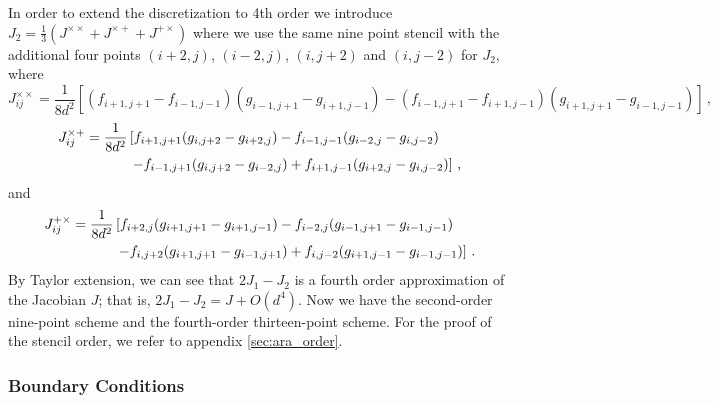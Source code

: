 In order to extend the discretization to 4th order we introduce $J_2=\frac{1}{3}(J^{\times \times} + J^{\times+} + J^{+\times})$ where we use the same nine point stencil with the additional
four points $(i+2,j)$, $(i-2,j)$, $(i,j+2)$  and $(i,j-2)$ for $J_2$, where
\begin{equation}
	J^{\times\times}_{ij} = \frac{1}{8d^2} \left[(f_{i+1,j+1} - f_{i-1,j-1}) (g_{i-1,j+1} - g_{i+1,j-1}) - (f_{i-1,j+1} - f_{i+1,j-1}) (g_{i+1,j+1} - g_{i-1,j-1}) \right] \, ,
\end{equation}
\begin{equation}
	\begin{aligned}
		J^{\times+}_{ij} & = \frac{1}{8d^2} \left[ f_{i+1,j+1} (g_{i,j+2} - g_{i+2,j}) - f_{i-1,j-1} (g_{i-2,j} - g_{i,j-2}) \right. \\
		& \hspace{11mm} \left. - f_{i-1,j+1} (g_{i,j+2} - g_{i-2,j}) + f_{i+1,j-1} (g_{i+2,j} - g_{i,j-2})\right] \, ,
	\end{aligned}
\end{equation}
and
\begin{equation}
	\begin{aligned}
		J^{+\times}_{ij} & = \frac{1}{8d^2} \left[f_{i+2,j} (g_{i+1,j+1} - g_{i+1,j-1}) - f_{i-2,j} (g_{i-1,j+1} - g_{i-1,j-1}) \right. \\
		& \hspace{11mm} \left. - f_{i,j+2} (g_{i+1,j+1} - g_{i-1,j+1}) + f_{i,j-2} (g_{i+1,j-1} - g_{i-1,j-1})\right] \, .
	\end{aligned}
\end{equation}
By Taylor extension, we can see that $2J_1-J_2$ is a fourth order approximation of the Jacobian $J$; that is,
$2J_1-J_2=J+O(d^4)$.
Now we have the second-order nine-point scheme and the fourth-order thirteen-point scheme. For the proof of the stencil order, we refer to appendix \ref{sec:ara_order}.







\subsubsection{Boundary Conditions}

